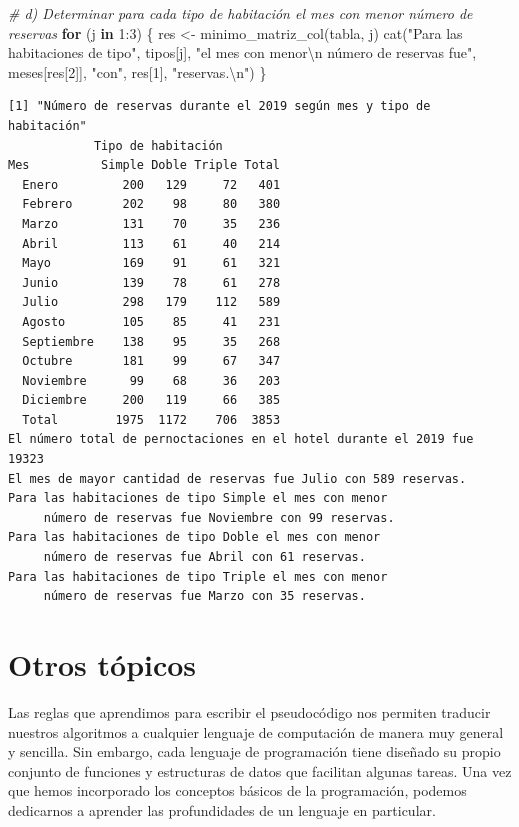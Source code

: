 \documentclass[
]{book}
\newenvironment{Shaded}{\begin{snugshade}}{\end{snugshade}}
\newcommand{\CommentTok}[1]{\textcolor[rgb]{0.56,0.35,0.01}{\textit{#1}}}
\newcommand{\ControlFlowTok}[1]{\textcolor[rgb]{0.13,0.29,0.53}{\textbf{#1}}}
\newcommand{\DecValTok}[1]{\textcolor[rgb]{0.00,0.00,0.81}{#1}}
\newcommand{\FunctionTok}[1]{\textcolor[rgb]{0.00,0.00,0.00}{#1}}
\newcommand{\NormalTok}[1]{#1}
\newcommand{\OtherTok}[1]{\textcolor[rgb]{0.56,0.35,0.01}{#1}}
\newcommand{\SpecialCharTok}[1]{\textcolor[rgb]{0.00,0.00,0.00}{#1}}
\newcommand{\StringTok}[1]{\textcolor[rgb]{0.31,0.60,0.02}{#1}}
\begin{document}
\begin{Shaded}
\begin{Highlighting}[]
\CommentTok{\# d) Determinar para cada tipo de habitación el mes con menor número de reservas}
\ControlFlowTok{for}\NormalTok{ (j }\ControlFlowTok{in} \DecValTok{1}\SpecialCharTok{:}\DecValTok{3}\NormalTok{) \{}
\NormalTok{    res }\OtherTok{\textless{}{-}} \FunctionTok{minimo\_matriz\_col}\NormalTok{(tabla, j)}
    \FunctionTok{cat}\NormalTok{(}\StringTok{"Para las habitaciones de tipo"}\NormalTok{, tipos[j], }
        \StringTok{"el mes con menor}\SpecialCharTok{\textbackslash{}n}\StringTok{     número de reservas fue"}\NormalTok{, }
\NormalTok{        meses[res[}\DecValTok{2}\NormalTok{]], }\StringTok{"con"}\NormalTok{, res[}\DecValTok{1}\NormalTok{], }\StringTok{"reservas.}\SpecialCharTok{\textbackslash{}n}\StringTok{"}\NormalTok{)}
\NormalTok{\}}
\end{Highlighting}
\end{Shaded}

\begin{verbatim}
[1] "Número de reservas durante el 2019 según mes y tipo de habitación"
            Tipo de habitación
Mes          Simple Doble Triple Total
  Enero         200   129     72   401
  Febrero       202    98     80   380
  Marzo         131    70     35   236
  Abril         113    61     40   214
  Mayo          169    91     61   321
  Junio         139    78     61   278
  Julio         298   179    112   589
  Agosto        105    85     41   231
  Septiembre    138    95     35   268
  Octubre       181    99     67   347
  Noviembre      99    68     36   203
  Diciembre     200   119     66   385
  Total        1975  1172    706  3853
El número total de pernoctaciones en el hotel durante el 2019 fue 19323 
El mes de mayor cantidad de reservas fue Julio con 589 reservas.
Para las habitaciones de tipo Simple el mes con menor
     número de reservas fue Noviembre con 99 reservas.
Para las habitaciones de tipo Doble el mes con menor
     número de reservas fue Abril con 61 reservas.
Para las habitaciones de tipo Triple el mes con menor
     número de reservas fue Marzo con 35 reservas.
\end{verbatim}

\hypertarget{otros-tuxf3picos}{%
\chapter{Otros tópicos}\label{otros-tuxf3picos}}

Las reglas que aprendimos para escribir el pseudocódigo nos permiten traducir nuestros algoritmos a cualquier lenguaje de computación de manera muy general y sencilla. Sin embargo, cada lenguaje de programación tiene diseñado su propio conjunto de funciones y estructuras de datos que facilitan algunas tareas. Una vez que hemos incorporado los conceptos básicos de la programación, podemos dedicarnos a aprender las profundidades de un lenguaje en particular.
\end{document}
